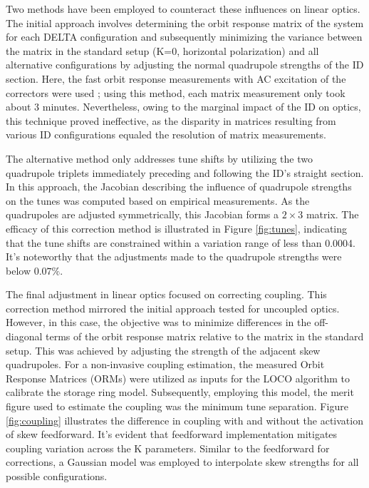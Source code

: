 \documentclass[a4paper,
               keeplastbox,   %
               ]{jacow}
\begin{document}
Two methods have been employed to counteract these influences on linear optics. The initial approach involves determining the orbit response matrix of the system for each DELTA configuration and subsequently minimizing the variance between the matrix in the standard setup (K=0, horizontal polarization) and all alternative configurations by adjusting the normal quadrupole strengths of the ID section. Here, the fast orbit response measurements with AC excitation of the correctors were used \cite{Velloso:IPAC22-MOPOTK002}; using this method, each matrix measurement only took about $3$ minutes. Nevertheless, owing to the marginal impact of the ID on optics, this technique proved ineffective, as the disparity in matrices resulting from various ID configurations equaled the resolution of matrix measurements.

The alternative method only addresses tune shifts by utilizing the two quadrupole triplets immediately preceding and following the ID's straight section. In this approach, the Jacobian describing the influence of quadrupole strengths on the tunes was computed based on empirical measurements. As the quadrupoles are adjusted symmetrically, this Jacobian forms a $2 \times 3$ matrix. The efficacy of this correction method is illustrated in Figure \ref{fig:tunes}, indicating that the tune shifts are constrained within a variation range of less than 0.0004. It's noteworthy that the adjustments made to the quadrupole strengths were below $0.07\%$.

The final adjustment in linear optics focused on correcting coupling. This correction method mirrored the initial approach tested for uncoupled optics. However, in this case, the objective was to minimize differences in the off-diagonal terms of the orbit response matrix relative to the matrix in the standard setup. This was achieved by adjusting the strength of the adjacent skew quadrupoles. For a non-invasive coupling estimation, the measured Orbit Response Matrices (ORMs) were utilized as inputs for the LOCO algorithm \cite{Safranek} to calibrate the storage ring model. Subsequently, employing this model, the merit figure used to estimate the coupling was the minimum tune separation. Figure \ref{fig:coupling} illustrates the difference in coupling with and without the activation of skew feedforward. It's evident that feedforward implementation mitigates coupling variation across the K parameters. Similar to the feedforward for corrections, a Gaussian model was employed to interpolate skew strengths for all possible configurations.
 
\end{document}
